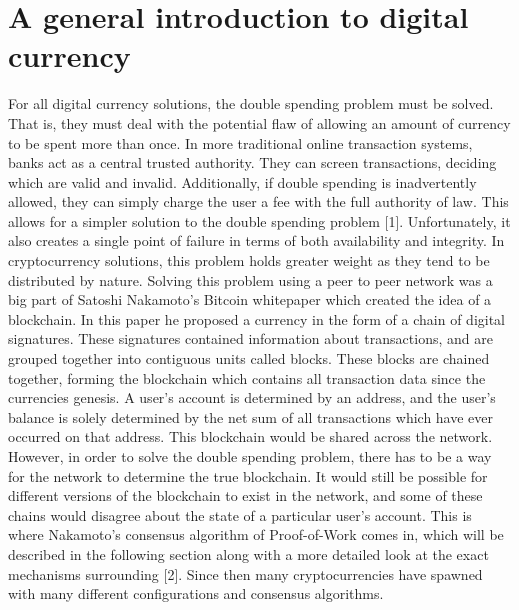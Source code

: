 \documentclass[11pt]{article}
\author{ethan}
\date{\today}
\title{}
\begin{document}
\tableofcontents

\section{A general introduction to digital currency}
\label{sec:org6785391}
For all digital currency solutions, the double spending problem must be solved. That is, they must deal with the potential flaw of allowing an amount of currency to be spent more than once. In more traditional online transaction systems, banks act as a central trusted authority. They can screen transactions, deciding which are valid and invalid. Additionally, if double spending is inadvertently allowed, they can simply charge the user a fee with the full authority of law. This allows for a simpler solution to the double spending problem [1]. Unfortunately, it also creates a single point of failure in terms of both availability and integrity.
In cryptocurrency solutions, this problem holds greater weight as they tend to be distributed by nature. Solving this problem using a peer to peer network was a big part of Satoshi Nakamoto's Bitcoin whitepaper which created the idea of a blockchain. In this paper he proposed a currency in the form of a chain of digital signatures. These signatures contained information about transactions, and are grouped together into contiguous units called blocks. These blocks are chained together, forming the blockchain which contains all transaction data since the currencies genesis. A user's account is determined by an address, and the user's balance is solely determined by the net sum of all transactions which have ever occurred on that address. This blockchain would be shared across the network. However, in order to solve the double spending problem, there has to be a way for the network to determine the true blockchain. It would still be possible for different versions of the blockchain to exist in the network, and some of these chains would disagree about the state of a particular user's account. This is where Nakamoto's consensus algorithm of Proof-of-Work comes in, which will be described in the following section along with a more detailed look at the exact mechanisms surrounding [2]. Since then many cryptocurrencies have spawned with many different configurations and consensus algorithms. 
\end{document}
